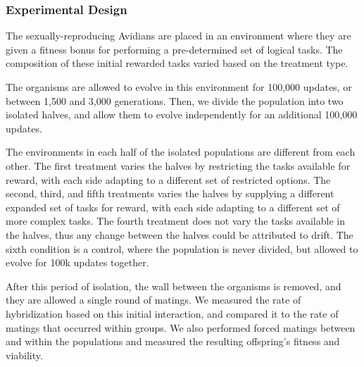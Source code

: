 \subsubsection{Experimental Design}

The sexually-reproducing Avidians are placed in an environment where they are given a fitness bonus for performing a pre-determined set of logical tasks.  The composition of these initial rewarded tasks varied based on the treatment type.

The organisms are allowed to evolve in this environment for 100,000 updates, or between 1,500 and 3,000 generations. Then, we divide the population into two isolated halves, and allow them to evolve independently for an additional 100,000 updates.

The environments in each half of the isolated populations are different from each other. The first treatment varies the halves by restricting the tasks available for reward, with each side adapting to a different set of restricted options. The second, third, and fifth treatments varies the halves by supplying a different expanded set of tasks for reward, with each side adapting to a different set of more complex tasks. The fourth treatment does not vary the tasks available in the halves, thus any change between the halves could be attributed to drift. The sixth condition is a control, where the population is never divided, but allowed to evolve for 100k updates together.

After this period of isolation, the wall between the organisms is removed, and they are allowed a single round of matings. We measured the rate of hybridization based on this initial interaction, and compared it to the rate of matings that occurred within groups. We also performed forced matings between and within the populations and measured the resulting offspring’s fitness and viability.